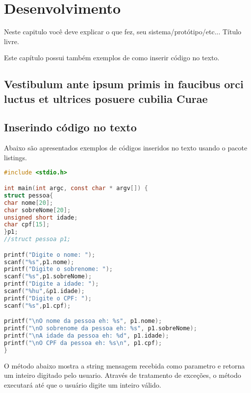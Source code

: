 \chapter{Desenvolvimento}
Neste capitulo você deve explicar o que fez, seu sistema/protótipo/etc... Título livre.\newline 

Este capítulo possui também exemplos de como inserir código no texto.
\section{Vestibulum ante ipsum primis in faucibus orci luctus et ultrices
posuere cubilia Curae}

\lipsum[21-22]

\section{Inserindo código no texto}

Abaixo são apresentados exemplos de códigos inseridos no texto usando o pacote listings.

\begin{lstlisting}[language=c, caption={Exemplo de código C}, upquote=true]
#include <stdio.h>

int main(int argc, const char * argv[]) {
struct pessoa{
char nome[20];
char sobreNome[20];
unsigned short idade;
char cpf[15];
}p1;
//struct pessoa p1;

printf("Digite o nome: ");
scanf("%s",p1.nome);
printf("Digite o sobrenome: ");
scanf("%s",p1.sobreNome);
printf("Digite a idade: ");
scanf("%hu",&p1.idade);
printf("Digite o CPF: ");
scanf("%s",p1.cpf);

printf("\nO nome da pessoa eh: %s", p1.nome);
printf("\nO sobrenome da pessoa eh: %s", p1.sobreNome);
printf("\nA idade da pessoa eh: %d", p1.idade);
printf("\nO CPF da pessoa eh: %s\n", p1.cpf);
}
\end{lstlisting}

\lipsum[1]




O método abaixo mostra a string mensagem recebida como parametro e retorna um inteiro digitado pelo usuario. Através de tratamento de exceções, o método executará até que o usuário digite um inteiro válido.



\lipsum[2-3]